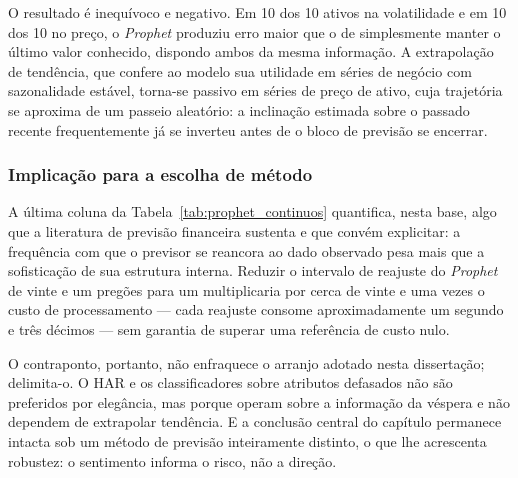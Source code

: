 O resultado é inequívoco e negativo. Em 10 dos 10 ativos na volatilidade e em 10 dos 10
no preço, o \textit{Prophet} produziu erro maior que o de simplesmente manter o último valor
conhecido, dispondo ambos da mesma informação. A extrapolação de tendência, que confere ao modelo
sua utilidade em séries de negócio com sazonalidade estável, torna-se passivo em séries de preço de
ativo, cuja trajetória se aproxima de um passeio aleatório: a inclinação estimada sobre o passado
recente frequentemente já se inverteu antes de o bloco de previsão se encerrar.

\subsubsection{Implicação para a escolha de método}

A última coluna da Tabela~\ref{tab:prophet_continuos} quantifica, nesta base, algo que a literatura
de previsão financeira sustenta e que convém explicitar: a frequência com que o previsor se
reancora ao dado observado pesa mais que a sofisticação de sua estrutura interna. Reduzir o
intervalo de reajuste do \textit{Prophet} de vinte e um pregões para um multiplicaria por cerca de
vinte e uma vezes o custo de processamento --- cada reajuste consome aproximadamente um segundo e
três décimos --- sem garantia de superar uma referência de custo nulo.

O contraponto, portanto, não enfraquece o arranjo adotado nesta dissertação; delimita-o. O HAR e os
classificadores sobre atributos defasados não são preferidos por elegância, mas porque operam
sobre a informação da véspera e não dependem de extrapolar tendência. E a conclusão central do
capítulo permanece intacta sob um método de previsão inteiramente distinto, o que lhe acrescenta
robustez: o sentimento informa o risco, não a direção.
